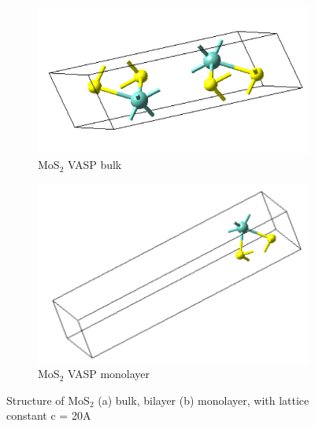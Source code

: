 \documentclass[microe]{ritthesis}
\begin{document}
\begin{figure}
\centering
\begin{subfigure}{0.25\linewidth}
\centering
\includegraphics[width=\linewidth]{MoS2_VASP_bulk.PNG}
\caption{MoS$_2$ VASP bulk}
\label{fig:sub:left}
\end{subfigure}
\quad\quad\quad\quad
\begin{subfigure}{0.25\linewidth}
\centering
\includegraphics[width=\linewidth]{MoS2_VASP_mono.PNG}
\caption{MoS$_2$ VASP monolayer}
\label{fig:sub:right}
\end{subfigure}
\caption{Structure of MoS$_2$ (a) bulk, bilayer (b) monolayer, with lattice constant c = 20A}
\label{fig:sub}
\end{figure}
\end{document}
